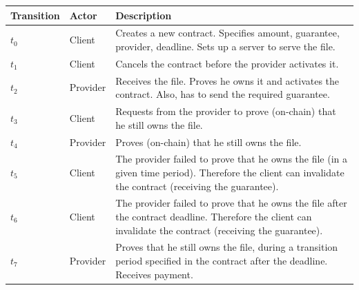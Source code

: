 \documentclass{article}
\begin{document}
\begin{table}
\centering
\begin{tabular}{|p{1.8cm}|p{1.5cm}|p{8cm}|}
\hline
\textbf{Transition} & \textbf{Actor} & \textbf{Description} \\
\hline
    $t_0$ & Client &
    Creates a new contract. Specifies amount, guarantee, provider,
    deadline. Sets up a server to serve the file.\\
\hline
    $t_1$ & Client  &
    Cancels the contract before the provider activates it.\\
\hline
    $t_2$ & Provider  &
    Receives the file. Proves he owns it and activates the contract. Also,
    has to send the required guarantee.\\
\hline
    $t_3$ & Client  &
    Requests from the provider to prove (on-chain) that he still owns the 
    file.\\
\hline
    $t_4$ & Provider  &
    Proves (on-chain) that he still owns the file.\\
\hline
    $t_5$ & Client  &
    The provider failed to prove that he owns the file (in a given time period).
    Therefore the client can invalidate the contract (receiving the guarantee).\\
\hline
    $t_6$ & Client  &
    The provider failed to prove that he owns the file after the contract
    deadline. Therefore the client can invalidate the contract (receiving the 
    guarantee).\\
\hline
    $t_7$ & Provider  &
    Proves that he still owns the file, during a transition period specified
    in the contract after the deadline. Receives payment.\\
\hline
\end{tabular}
\end{table}
\end{document}
